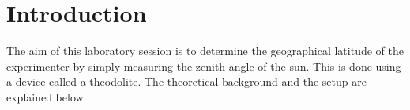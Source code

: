 
\chapter{Introduction}
\label{chap:einleitung}

The aim of this laboratory session is to determine the geographical latitude of the experimenter by simply measuring the zenith angle of the sun. This is done using a device called a theodolite. The theoretical background and the setup are explained below. 